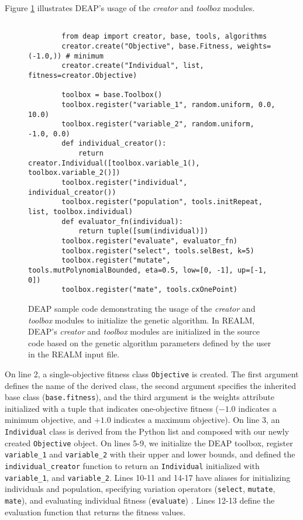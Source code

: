 Figure \ref{fig:deap-code} illustrates DEAP's usage of the \textit{creator} and
\textit{toolbox} modules. 
\begin{figure}[]
    \begin{verbatim}
        
        from deap import creator, base, tools, algorithms
        creator.create("Objective", base.Fitness, weights=(-1.0,)) # minimum
        creator.create("Individual", list, fitness=creator.Objective)

        toolbox = base.Toolbox()
        toolbox.register("variable_1", random.uniform, 0.0, 10.0)
        toolbox.register("variable_2", random.uniform, -1.0, 0.0)
        def individual_creator():
            return creator.Individual([toolbox.variable_1(), toolbox.variable_2()])
        toolbox.register("individual", individual_creator())
        toolbox.register("population", tools.initRepeat, list, toolbox.individual)
        def evaluator_fn(individual):
            return tuple([sum(individual)])
        toolbox.register("evaluate", evaluator_fn)
        toolbox.register("select", tools.selBest, k=5)
        toolbox.register("mutate", tools.mutPolynomialBounded, eta=0.5, low=[0, -1], up=[-1, 0])
        toolbox.register("mate", tools.cxOnePoint)
    \end{verbatim}
    \caption{DEAP sample code demonstrating the usage of the \textit{creator} and
    \textit{toolbox} modules to initialize the genetic algorithm. In REALM, DEAP's 
    \textit{creator} and \textit{toolbox} modules are initialized in the source 
    code based on the genetic algorithm parameters defined by the user in the 
    REALM input file. }
    \label{fig:deap-code}
\end{figure}
On line 2, a single-objective fitness class \texttt{Objective} is created. 
The first argument defines the name of the derived class, the second argument 
specifies the inherited base class (\texttt{base.fitness}), and the third 
argument is the weights attribute initialized with a tuple that indicates
one-objective fitness ($-1.0$ indicates a minimum objective, and $+1.0$ 
indicates a maximum objective). 
On line 3, an \texttt{Individual} class is derived from the Python list and 
composed with our newly created \texttt{Objective} object. 
On lines 5-9, we initialize the \gls{DEAP} toolbox, register 
\texttt{variable\_1} and \texttt{variable\_2} with their upper and lower bounds, 
and defined the \texttt{individual\_creator} function to return an 
\texttt{Individual} initialized with \texttt{variable\_1}, and \texttt{variable\_2}. 
Lines 10-11 and 14-17 have aliases for initializing individuals and population, 
specifying variation operators (\texttt{select}, \texttt{mutate}, \texttt{mate}), 
and evaluating individual fitness (\texttt{evaluate}) \cite{fortin_deap_2012}. 
Lines 12-13 define the evaluation function that returns the fitness values. 

